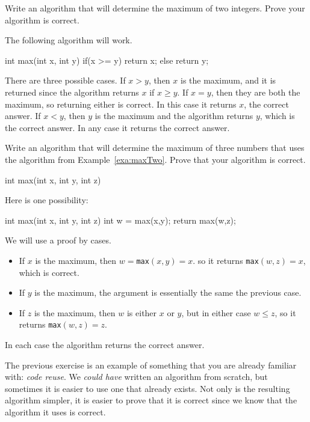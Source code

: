 \begin{exa}\label{exa:maxTwo}
Write an algorithm that will determine the maximum of two integers.  
Prove your algorithm is correct.
\begin{sol}
The following algorithm will work.
\begin{code}
  int max(int x, int y) {
      if(x >= y) {
          return x;
      } else {
          return y;
      }
  }
\end{code}
There are three possible cases.  If $x>y$, then $x$ is the maximum, and it is returned
since the algorithm returns $x$ if $x\geq y$.
If $x=y$, then they are both the maximum, so returning either is correct.  In this case
it returns $x$, the correct answer.
If $x<y$, then $y$ is the maximum and the algorithm returns $y$, which is the correct answer.
In any case it returns the correct answer.
\end{sol}
\end{exa}

\begin{exer}
Write an algorithm that will determine the maximum of three numbers
that uses the algorithm from Example~\ref{exa:maxTwo}.
Prove that your algorithm is correct.
\begin{code}
  int max(int x, int y, int z) {
	
	
	
	
  }
\end{code}
\pflinethree
\begin{answer} 
Here is one possibility:
\begin{code}
    int max(int x, int y, int z) {
        int w = max(x,y);
        return max(w,z);
    }
\end{code}
We will use a proof by cases.  
\begin{itemize}
\item
If $x$ is the maximum, then $w=$\verb+max+$(x,y) = x$.
so it returns \verb+max+$(w,z)=x$, which is correct.  
\item
If $y$ is the maximum, the argument is essentially the same the previous case.
\item
If $z$ is the maximum, then $w$ is either $x$ or $y$, but in either case $w\leq z$, 
so it returns \verb+max+$(w,z)=z$.
\end{itemize}
In each case the algorithm returns the correct answer.
\end{answer}
\end{exer}

The previous exercise is an example of something that you are already familiar with: {\em code reuse}.
We {\em could have} written an algorithm from scratch, but sometimes it is easier to use one that already
exists.  Not only is the resulting algorithm simpler, it is easier to prove that it is correct
since we know that the algorithm it uses is correct.

